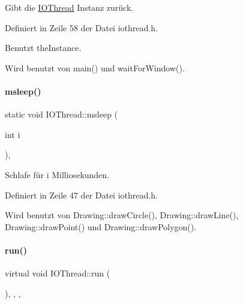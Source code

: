 Gibt die \mbox{\hyperlink{classIOThread}{I\+O\+Thread}} Instanz zurück. 



Definiert in Zeile 58 der Datei iothread.\+h.



Benutzt the\+Instance.



Wird benutzt von main() und wait\+For\+Window().

\mbox{\label{classIOThread_a0edafa7b86ce9da704411c957c67a7d2}} 
\paragraph{\texorpdfstring{msleep()}{msleep()}}
{\footnotesize\ttfamily static void I\+O\+Thread\+::msleep (\begin{DoxyParamCaption}\item[{int}]{i }\end{DoxyParamCaption})\hspace{0.3cm}{\ttfamily [inline]}, {\ttfamily [static]}}



Schlafe für {\ttfamily i} Milliosekunden. 



Definiert in Zeile 47 der Datei iothread.\+h.



Wird benutzt von Drawing\+::draw\+Circle(), Drawing\+::draw\+Line(), Drawing\+::draw\+Point() und Drawing\+::draw\+Polygon().

\mbox{\label{classIOThread_a9f1baa38fcd96609fd824f78f3072be9}} 
\paragraph{\texorpdfstring{run()}{run()}}
{\footnotesize\ttfamily virtual void I\+O\+Thread\+::run (\begin{DoxyParamCaption}{ }\end{DoxyParamCaption})\hspace{0.3cm}{\ttfamily [inline]}, {\ttfamily [override]}, {\ttfamily [protected]}, {\ttfamily [virtual]}}



